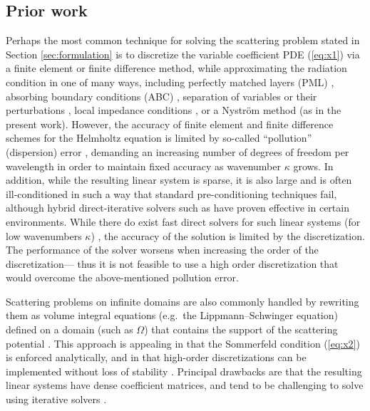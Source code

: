 \documentclass[11pt,final]{amsart}
\theoremstyle{definition}
\numberwithin{remark}{section}
\numberwithin{definition}{section}
\numberwithin{pro}{section}
\begin{document}
\subsection{Prior work}
Perhaps the most common technique for solving the scattering problem stated in
Section \ref{sec:formulation} is
to discretize the variable coefficient PDE (\ref{eq:x1})
via a finite element or finite difference method,
while approximating the radiation condition in one of many ways,
including
perfectly matched layers (PML) \cite{FDS_helmholtz_PML}, absorbing boundary
conditions (ABC) \cite{ABC_1977},
separation of variables or their perturbations \cite{nichollsnigam04},
local impedance conditions \cite{britt10},
or a Nystr\"om method \cite{kirschmonk94} (as in the present work).
However, the accuracy of finite element and finite difference
schemes for the Helmholtz equation is limited by so-called ``pollution''
(dispersion) error \cite{pollution,bayliss85},
demanding an increasing number of degrees of freedom per
wavelength in order to maintain fixed accuracy as wavenumber $\kappa$ grows.
In addition, while the resulting linear system is sparse, it is also large
and is often ill-conditioned in such a way that standard pre-conditioning techniques fail, although hybrid direct-iterative
solvers such as \cite{2011_engquist_ying_PML} have proven effective in certain environments.
While there do exist fast
direct solvers for such linear systems (for low wavenumbers $\kappa$)
\cite{2011_ying_nested_dissection_2D,2011_ying_nested_dissection_3D,2009_xia_superfast,2009_martinsson_FEM}, the accuracy of the
solution is limited by the discretization.
The performance of the solver worsens when increasing the order of the discretization---%
thus it is not feasible to use a high order discretization that would overcome the
above-mentioned pollution error.


Scattering problems on infinite domains are also commonly handled by
rewriting them as volume integral equations (e.g.~the
Lippmann--Schwinger equation) defined on a domain (such as $\Omega$)
that contains the support of the scattering potential \cite{Ang,2002_chen_direct_lippman_schwinger}.
This approach is appealing in that the Sommerfeld condition (\ref{eq:x2}) is enforced
analytically, and in that high-order discretizations can be implemented
without loss of stability \cite{2008_duan_rokhlin}. Principal drawbacks are
that the resulting linear systems have dense coefficient matrices, and tend
to be challenging to solve using iterative solvers \cite{2008_duan_rokhlin}.
\end{document}
